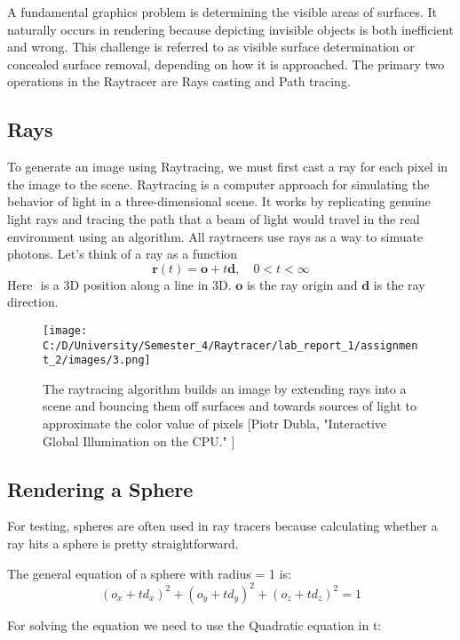 \documentclass{article}
\begin{document}
	A fundamental graphics problem is determining the visible areas of surfaces. It naturally occurs in rendering because depicting invisible objects is both inefficient and wrong. This challenge is referred to as visible surface determination or concealed surface removal, depending on how it is approached. The primary two operations in the Raytracer are Rays casting and Path tracing. 
	
	\subsection{Rays}
	To generate an image using Raytracing, we must first cast a ray for each pixel in the image to the scene.
	Raytracing is a computer approach for simulating the behavior of light in a three-dimensional scene. It works by replicating genuine light rays and tracing the path that a beam of light would travel in the real environment using an algorithm. 
	All raytracers use rays as a way to simuate photons. Let’s think of a ray as a function \[\pmb{r} (t) = \pmb{o} + t\pmb{d} ,  \quad  0 < t < \infty \] Here $\pmb{} $ is a 3D position along a line
	in 3D. $\pmb{o} $ is the ray origin and $\pmb{d} $ is the ray direction.
	
	\begin{figure}[H]
		\begin{center}
			\texttt{[image: C:/D/University/Semester\_4/Raytracer/lab\_report\_1/assignment\_2/images/3.png]}
			
			\caption{The raytracing algorithm builds an image by extending rays into a scene and bouncing them off surfaces and towards sources of light to approximate the color value of pixels [Piotr Dubla, "Interactive Global Illumination on the CPU."
				]}
			\label{fig:1}
		\end{center}
	\end{figure}
	
	\subsection{Rendering a Sphere}
	For testing, spheres are often used in ray tracers because
	calculating whether a ray hits a sphere is pretty straightforward.
	
	The general equation of a sphere with radius = 1 is:
	\begin{equation}
		(o_x + td_x )^2 + (o_y + td_y )^2+ (o_z + td_z )^2= 1
	\end{equation}
	
	For solving the equation we need to use the Quadratic equation in t: 
	
\end{document}
